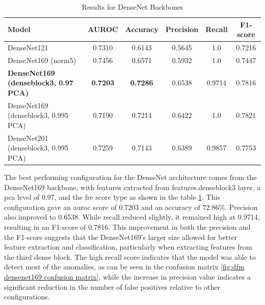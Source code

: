 \begin{table}[ht!]
    \centering
    \begin{tabular}{|l|c|c|c|c|c|}
        \hline
        \textbf{Model} & \textbf{AUROC} & \textbf{Accuracy} & \textbf{Precision} & \textbf{Recall} & \textbf{F1-score} \\ \hline
        DenseNet121 & 0.7310 & 0.6143 & 0.5645 & 1.0 & 0.7216 \\ \hline
        DenseNet169 (norm5) & 0.7456 & 0.6571 & 0.5932 & 1.0 & 0.7447 \\ \hline
        \textbf{DenseNet169 (denseblock3, 0.97 PCA)} & \textbf{0.7203} & \textbf{0.7286} & 0.6538 & 0.9714 & 0.7816 \\ \hline
        DenseNet169 (denseblock3, 0.995 PCA) & 0.7190 & 0.7214 & 0.6422 & 1.0 & 0.7821 \\ \hline
        DenseNet201 (denseblock3, 0.995 PCA) & 0.7259 & 0.7143 & 0.6389 & 0.9857 & 0.7753 \\ \hline
    \end{tabular}
    \caption{Results for DenseNet Backbones}
    \label{tab:dfm densenet results}
\end{table}

The best performing configuration for the DenseNet architecture comes from the DenseNet169 backbone, with features extracted from features.denseblock3 layer, a \gls{pca} level of 0.97, and the \gls{fre} score type as shown in the table \ref{tab:dfm densenet results}. This configuration gave an \gls{auroc} score of 0.7203 and an accuracy of 72.86\%. Precision also improved to 0.6538. While recall reduced slightly, it remained high at 0.9714, resulting in an F1-score of 0.7816. This improvement in both the precision and the F1-score suggests that the DenseNet169's larger size allowed for better feature extraction and classification, particularly when extracting features from the third dense block. The high recall score indicates that the model was able to detect most of the anomalies, as can be seen in the confusion matrix \ref{fig:dfm densenet169 confusion matrix}, while the increase in precision value indicates a significant reduction in the number of false positives relative to other configurations.

